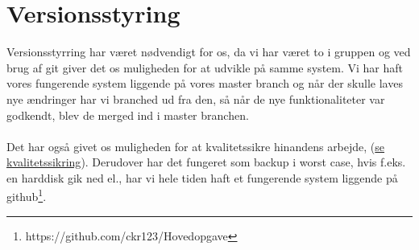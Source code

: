 \section{Versionsstyring}
Versionsstyrring har været nødvendigt for os, da vi har været to i gruppen og ved brug af git giver det os
muligheden for at udvikle på samme system. 
Vi har haft vores fungerende system liggende på vores master branch og når der skulle laves nye ændringer har vi branched ud fra den, så når de nye funktionaliteter var godkendt, blev de merged ind i master branchen.
\\\\
Det har også givet os muligheden for at kvalitetssikre hinandens arbejde, (\hyperlink{kvalitetssikring}{se kvalitetssikring}).
Derudover har det fungeret som backup i worst case, hvis f.eks. en harddisk gik ned el.,
har vi hele tiden haft et fungerende system liggende på github\footnote{https://github.com/ckr123/Hovedopgave}. 
